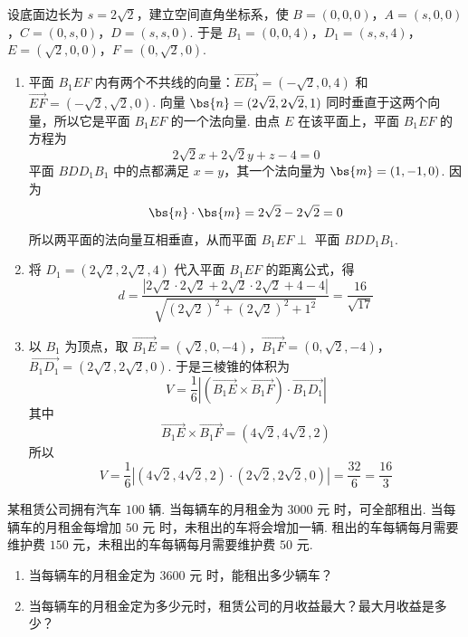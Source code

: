 \begin{solution}
设底面边长为 \(s=2\sqrt2\)，建立空间直角坐标系，使 \(B=(0,0,0)\)，\(A=(s,0,0)\)，\(C=(0,s,0)\)，\(D=(s,s,0)\). 于是 \(B_1=(0,0,4)\)，\(D_1=(s,s,4)\)，\(E=(\sqrt2,0,0)\)，\(F=(0,\sqrt2,0)\).

\begin{enumerate}
\item 平面 \(B_1EF\) 内有两个不共线的向量：\(\overrightarrow{EB_1}=(-\sqrt2,0,4)\) 和 \(\overrightarrow{EF}=(-\sqrt2,\sqrt2,0)\).
向量 \(\bs{n}=(2\sqrt2,2\sqrt2,1)\) 同时垂直于这两个向量，所以它是平面 \(B_1EF\) 的一个法向量. 由点 \(E\) 在该平面上，平面 \(B_1EF\) 的方程为
\[
2\sqrt2x+2\sqrt2y+z-4=0
\]
平面 \(BDD_1B_1\) 中的点都满足 \(x=y\)，其一个法向量为 \(\bs{m}=(1,-1,0)\). 因为
\[
\bs{n}\cdot\bs{m}=2\sqrt2-2\sqrt2=0
\]
所以两平面的法向量互相垂直，从而平面 \(B_1EF\perp\) 平面 \(BDD_1B_1\).

\item 将 \(D_1=(2\sqrt2,2\sqrt2,4)\) 代入平面 \(B_1EF\) 的距离公式，得
\[
d=\dfrac{\left|2\sqrt2\cdot2\sqrt2+2\sqrt2\cdot2\sqrt2+4-4\right|}{\sqrt{(2\sqrt2)^2+(2\sqrt2)^2+1^2}}
=\dfrac{16}{\sqrt{17}}
\]

\item 以 \(B_1\) 为顶点，取
\(\overrightarrow{B_1E}=(\sqrt2,0,-4)\)，\(\overrightarrow{B_1F}=(0,\sqrt2,-4)\)，\(\overrightarrow{B_1D_1}=(2\sqrt2,2\sqrt2,0)\).
于是三棱锥的体积为
\[
V=\dfrac16\left|\left(\overrightarrow{B_1E}\times\overrightarrow{B_1F}\right)\cdot\overrightarrow{B_1D_1}\right|
\]
其中
\[
\overrightarrow{B_1E}\times\overrightarrow{B_1F}=(4\sqrt2,4\sqrt2,2)
\]
所以
\[
V=\dfrac16\left|(4\sqrt2,4\sqrt2,2)\cdot(2\sqrt2,2\sqrt2,0)\right|=\dfrac{32}{6}=\dfrac{16}{3}
\]
\end{enumerate}
\end{solution}

\begin{problem}
某租赁公司拥有汽车 \(100\text{ 辆}\). 当每辆车的月租金为 \(3000\text{ 元}\) 时，可全部租出. 当每辆车的月租金每增加 \(50\text{ 元}\) 时，未租出的车将会增加一辆. 租出的车每辆每月需要维护费 \(150\text{ 元}\)，未租出的车每辆每月需要维护费 \(50\text{ 元}\).

\begin{enumerate}
\item 当每辆车的月租金定为 \(3600\text{ 元}\) 时，能租出多少辆车？
\item 当每辆车的月租金定为多少元时，租赁公司的月收益最大？最大月收益是多少？
\end{enumerate}
\end{problem}

